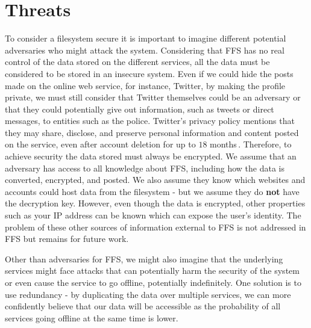 \section{Threats}
To consider a filesystem secure it is important to imagine different potential adversaries who might attack the system. Considering that \gls{FFS} has no real control of the data stored on the different services, all the data must be considered to be stored in an insecure system. Even if we could hide the posts made on the online web service, for instance, Twitter, by making the profile private, we must still consider that Twitter themselves could be an adversary or that they could potentially give out information, such as tweets or direct messages, to entities such as the police. Twitter's privacy policy mentions that they may share, disclose, and preserve personal information and content posted on the service, even after account deletion for up to $18$ months\,\cite{TwitterPrivacyPolicy}. Therefore, to achieve security the data stored must always be encrypted. We assume that an adversary has access to all knowledge about \gls{FFS}, including how the data is converted, encrypted, and posted. We also assume they know which websites and accounts could host data from the filesystem - but we assume they do \textbf{not} have the decryption key. However, even though the data is encrypted, other properties such as your IP address can be known which can expose the user's identity. The problem of these other sources of information external to \gls{FFS} is not addressed in \gls{FFS} but remains for future work.

Other than adversaries for \gls{FFS}, we might also imagine that the underlying services might face attacks that can potentially harm the security of the system or even cause the service to go offline, potentially indefinitely. One solution is to use redundancy - by duplicating the data over multiple services, we can more confidently believe that our data will be accessible as the probability of all services going offline at the same time is lower.

